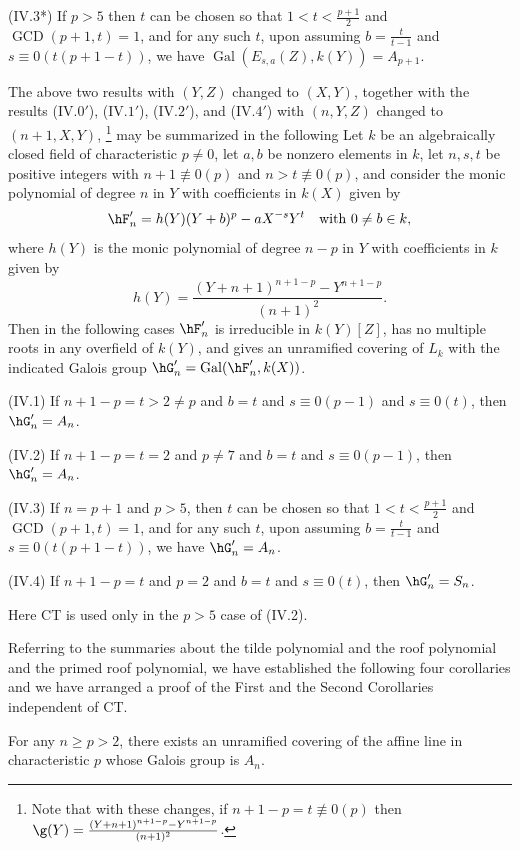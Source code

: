 (IV.3*) If $p>5$ then $t$ can be chosen so that 
$1<t<\frac{p+1}{2}$
and$\operatorname{GCD}
(p+1,t)=1$, and for any such $t$, upon assuming 
$b=\frac{t}{t-1}$
and $s\equiv
 0(t(p+1-t))$, we have 
$\operatorname{Gal}(E_{s,a}(Z),k(Y))=A_{p+1}$.

The above two results with $(Y,Z)$ changed to 
$(X,Y)$, together with the 
results (IV.$0'$), (IV.$1'$), (IV.$2'$), and (IV.$4'$) 
with $(n,Y,Z)$ 
changed
to$(n+1,X,Y)$, 
\footnote{Note that with these changes, if $n+
1-p=t\not\equiv 0(p)$ then 
$\g(Y)=\frac
{(Y+n+1)^{n+1-p}-Y^{n+1-p}}{(n+1)^{2}}$.}
may be summarized in the following
{}
Let $k$ be an algebraically closed field of characteristic 
$p\ne 0$, let
$a,b$ be nonzero elements in $k$, let $n,s,t$ be positive 
integers with 
$n+1\not\equiv 0(p)$ and $n>t\not\equiv 0(p)$, and 
consider the monic 
polynomial of degree $n$ in $Y$ with coefficients in 
$k(X)$ given by
$$
\hF'_n=h(Y)(Y+b)^p-aX^{-s}Y^t\quad\text{with }0\neq b\in k,
$$
where $h(Y)$ is the monic polynomial of degree $n-p$ in 
$Y$ with coefficients 
in $k$ given by
$$
h(Y)=\frac{(Y+n+1)^{n+1-p}-Y^{n+1-p}}{(n+1)^2}.
$$
Then in the following cases $\hF'_n$ is irreducible in 
$k(Y)[Z]$, has no
multiple roots in any overfield of $k(Y)$, and gives an 
unramified covering of 
$L_k$ with the indicated Galois group 
$\hG'_n=\operatorname{Gal}(\hF'_n,k(X))$.

(IV.1) If $n+1-p=t>2\neq p$ and $b=t$ and $s\equiv 0(p-1)$ 
and $s\equiv 0(t)$, 
then $\hG'_n=A_n$.

(IV.2) If $n+1-p=t=2$ and $p\neq 7$ and $b=t$ and $s\equiv 
0(p-1)$, 
then $\hG'_n=A_n$.

(IV.3) If $n=p+1$ and $p>5$, then $t$ can be chosen so 
that $1<t<\frac{p+1}{2}$
and $\operatorname{GCD}(p+1,t)=1$, and for any such $t$, 
upon assuming
$b=\frac{t}{t-1}$ and $s\equiv 0(t(p+1-t))$, we have 
$\hG'_n=A_n$. 

(IV.4) If $n+1-p=t$ and $p=2$ and $b=t$ and $s\equiv 0(t)$, 
then $\hG'_n=S_n$.

Here CT is used only in the $p>5$ case of (IV.2).

Referring to the summaries about the tilde polynomial and 
the roof
polynomial and the primed roof polynomial, we have 
established the following
four corollaries and we have arranged a proof of the First 
and the Second 
Corollaries independent of CT.

 For any $n\geq p >2$,
there exists an unramified covering of the affine line in 
characteristic
$p$ whose Galois group is $A_n$.
\endproclaim

